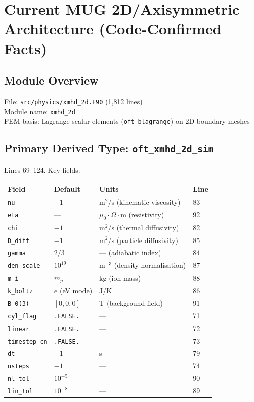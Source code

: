 \documentclass[11pt,letterpaper]{article}
\begin{document}
\section{Current MUG 2D/Axisymmetric Architecture (Code-Confirmed Facts)}

\subsection{Module Overview}

File: \texttt{src/physics/xmhd\_2d.F90} (1{,}812 lines)\\
Module name: \texttt{xmhd\_2d}\\
FEM basis: Lagrange scalar elements (\texttt{oft\_blagrange}) on 2D boundary meshes

\subsection{Primary Derived Type: \texttt{oft\_xmhd\_2d\_sim}}

Lines 69--124.  Key fields:

\begin{center}
\begin{tabular}{llll}
\toprule
\textbf{Field} & \textbf{Default} & \textbf{Units} & \textbf{Line} \\
\midrule
\texttt{nu} & $-1$ & m$^2$/s (kinematic viscosity) & 83 \\
\texttt{eta} & --- & $\mu_0 \cdot \Omega\cdot\text{m}$ (resistivity) & 92 \\
\texttt{chi} & $-1$ & m$^2$/s (thermal diffusivity) & 82 \\
\texttt{D\_diff} & $-1$ & m$^2$/s (particle diffusivity) & 85 \\
\texttt{gamma} & $2/3$ & --- (adiabatic index) & 84 \\
\texttt{den\_scale} & $10^{19}$ & m$^{-3}$ (density normalisation) & 87 \\
\texttt{m\_i} & $m_p$ & kg (ion mass) & 88 \\
\texttt{k\_boltz} & $e$ (eV mode) & J/K & 86 \\
\texttt{B\_0(3)} & $[0,0,0]$ & T (background field) & 91 \\
\texttt{cyl\_flag} & \texttt{.FALSE.} & --- & 71 \\
\texttt{linear} & \texttt{.FALSE.} & --- & 72 \\
\texttt{timestep\_cn} & \texttt{.FALSE.} & --- & 73 \\
\texttt{dt} & $-1$ & s & 79 \\
\texttt{nsteps} & $-1$ & --- & 74 \\
\texttt{nl\_tol} & $10^{-5}$ & --- & 90 \\
\texttt{lin\_tol} & $10^{-8}$ & --- & 89 \\
\bottomrule
\end{tabular}
\end{center}
\end{document}
